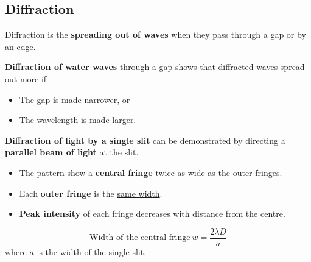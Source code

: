 \subsection{Diffraction}

Diffraction is the \textbf{spreading out of waves} when they pass through a gap or by an edge.

\textbf{Diffraction of water waves} through a gap shows that diffracted waves spread out more if
\begin{itemize}
    \item The gap is made narrower, or
    \item The wavelength is made larger.
\end{itemize}

\textbf{Diffraction of light by a single slit} can be demonstrated by directing a \textbf{parallel beam of light} at the slit.
\begin{itemize}
    \item The pattern show a \textbf{central fringe} \underline{twice as wide} as the outer fringes.
    \item Each \textbf{outer fringe} is the \underline{same width}.
    \item \textbf{Peak intensity} of each fringe \underline{decreases with distance} from the centre.
\end{itemize}
$$\text{Width of the central fringe}\ w=\frac{2\lambda D}{a}$$
where $a$ is the width of the single slit.
